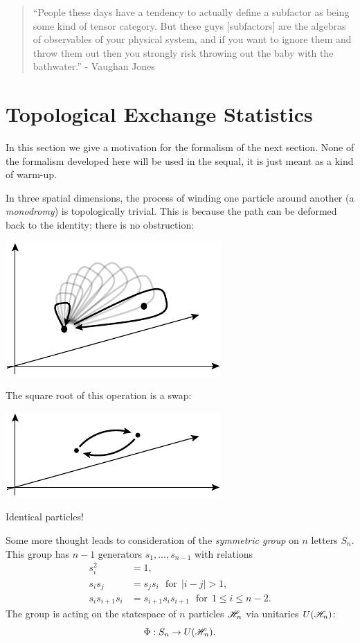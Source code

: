 \documentclass[aps, prl, letterpaper, twocolumn, superscriptaddress, notitlepage, 10pt]{revtex4-1}
\begin{document}
\begin{quotation}
``People these days have a tendency 
to actually define a subfactor as being some kind of
tensor category.
But these guys [subfactors] are the algebras of observables
of your physical system, and if you want to
ignore them and throw them out then you strongly
risk throwing out the baby with the bathwater.''
- Vaughan Jones~\cite{Jones2015}
\end{quotation}

%
%

\section{Topological Exchange Statistics}

In this section we give a motivation 
for the formalism of the next section. 
None of the formalism developed here will be
used in the sequal, it is just meant as
a kind of warm-up.

In three spatial dimensions, the process of winding one
particle around another (a \emph{monodromy}) is topologically trivial.
This is because the path can be deformed back to the
identity; there is no obstruction:
\begin{center}
\includegraphics[]{pic-monodromy3d.pdf}
\end{center}
The square root of this operation is a swap:
\begin{center}
\includegraphics[]{pic-swap.pdf}
\end{center}
Identical particles!

Some more thought leads to consideration of the \emph{symmetric group}
on $n$ letters $S_n$. 
This group has $n-1$ generators $s_1,...,s_{n-1}$ with relations
\begin{align*}
    s_i^2 &= 1, \\
    s_i s_j &= s_j s_i \ \ \ \mbox{for}\ \ |i-j|>1,\\
    s_i s_{i+1} s_i &= s_{i+1} s_i s_{i+1} \ \ \ \mbox{for}\ \ 1\le i \le n-2.
\end{align*}
The group is acting on the statespace of $n$ particles $\mathscr{H}_n$
via unitaries $U(\mathscr{H}_n)$:
$$
    \Phi : S_n \to U(\mathscr{H}_n).
$$
\end{document}
